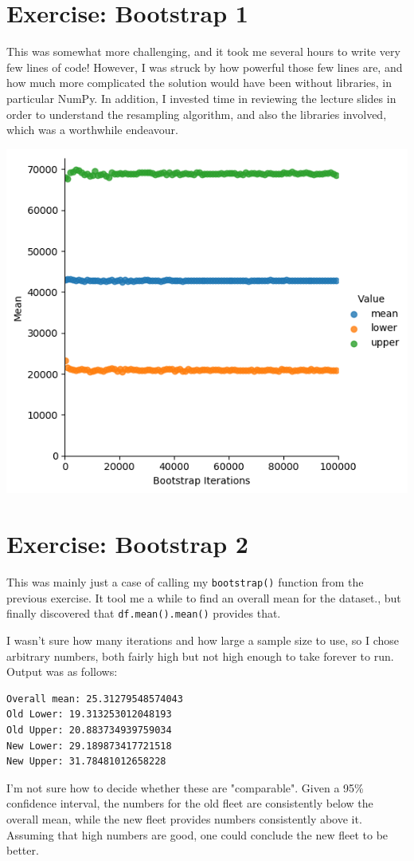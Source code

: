 \documentclass[a4paper]{article}
\begin{document}
\section{Exercise: Bootstrap 1}

This was somewhat more challenging, and it took me several hours to write very few lines of code! However, I was struck by how powerful those few lines are, and how much more complicated the solution would have been without libraries, in particular NumPy. In addition, I invested time in reviewing the lecture slides in order to understand the resampling algorithm, and also the libraries involved, which was a worthwhile endeavour.

\begin{center}
   \includegraphics[scale=0.6]{bootstrap_confidence.png}
\end{center}

\section{Exercise: Bootstrap 2}

This was mainly just a case of calling my \texttt{bootstrap()} function from the previous exercise. It tool me a while to find an overall mean for the dataset., but finally discovered that \texttt{df.mean().mean()} provides that.

I wasn't sure how many iterations and how large a sample size to use, so I chose arbitrary numbers, both fairly high but not high enough to take forever to run. Output was as follows:

\begin{verbatim}
Overall mean: 25.31279548574043
Old Lower: 19.313253012048193
Old Upper: 20.883734939759034
New Lower: 29.189873417721518
New Upper: 31.78481012658228
\end{verbatim}

I'm not sure how to decide whether these are "comparable". Given a 95\% confidence interval, the numbers for the old fleet are consistently below the overall mean, while the new fleet provides numbers consistently above it. Assuming that high numbers are good, one could conclude the new fleet to be better.
\end{document}
